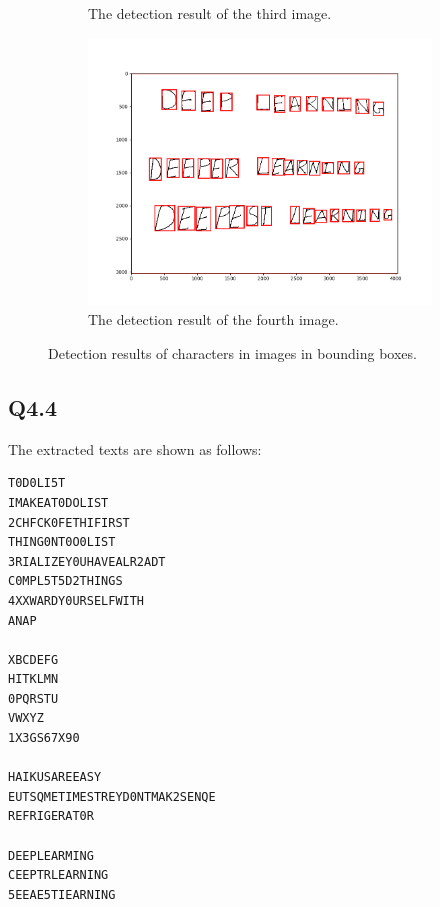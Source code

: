\documentclass[11pt]{article}
\begin{document}
\begin{figure}[h!]
\begin{subfigure}{.495\textwidth}
      \caption{The detection result of the third image. }
    \end{subfigure}
    \begin{subfigure}{.495\textwidth}
      \centering
      \includegraphics[width=.9\linewidth]{../results/q4_3_4.png}
      \caption{The detection result of the fourth image. }
    \end{subfigure}\hfill
    \caption{Detection results of characters in images in bounding boxes. }
    \label{fig:q4.3}
\end{figure}

\newpage
\subsection{Q4.4}

The extracted texts are shown as follows:

\begin{verbatim}
T0D0LI5T
IMAKEAT0DOLIST
2CHFCK0FETHIFIRST
THING0NT0O0LIST
3RIALIZEY0UHAVEALR2ADT
C0MPL5T5D2THINGS
4XXWARDY0URSELFWITH
ANAP

XBCDEFG
HITKLMN
0PQRSTU
VWXYZ
1X3GS67X90

HAIKUSAREEASY
EUTSQMETIMESTREYD0NTMAK2SENQE
REFRIGERAT0R

DEEPLEARMING
CEEPTRLEARNING
5EEAE5TIEARNING
\end{verbatim}
\end{document}
